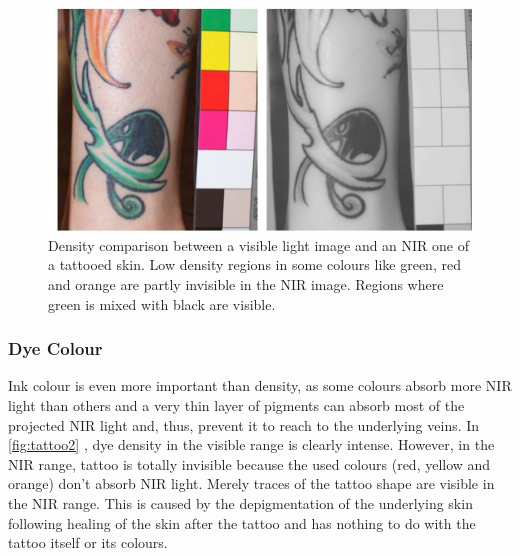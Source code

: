 \begin{figure}[H]
\centering
\includegraphics[scale=0.6]{figures/tattoo1.JPG}

\caption[Density comparison between a visible light image and an NIR one of a tattooed skin]{Density comparison between a visible light image and an NIR one of a tattooed skin. Low density regions in some colours like green, red and orange are partly invisible in the NIR image. Regions where green is mixed with black are visible.}\label{fig:tattoo1}
\end{figure}

\subsubsection{Dye Colour}
Ink colour is even more important than density, as some colours absorb more NIR light than others and a very thin layer of pigments can absorb most of the projected NIR light and, thus, prevent it to reach to the underlying veins. In \autoref{fig:tattoo2} \parencite{tatto},  dye density in the visible range is clearly intense. However, in the NIR range, tattoo is totally invisible because the used colours (red, yellow and orange) don’t absorb NIR light. Merely traces of the tattoo shape are visible in the NIR range. This is caused by the depigmentation of the underlying skin following healing of the skin after the tattoo \parencite{tatto} and has nothing to do with the tattoo itself or its colours.

